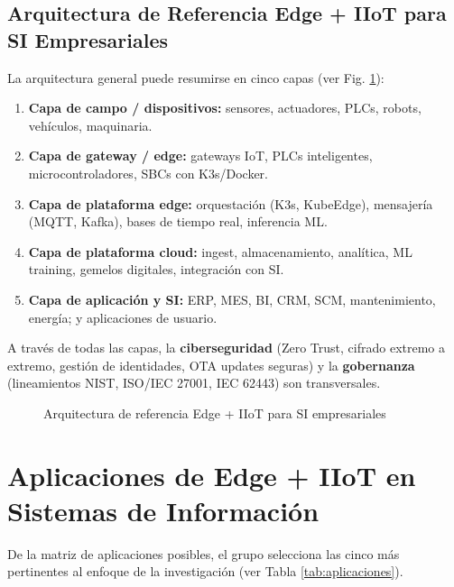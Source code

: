 ﻿\documentclass[12pt,a4paper,oneside]{article}
\begin{document}
\subsection{Arquitectura de Referencia Edge + IIoT para SI Empresariales}

La arquitectura general puede resumirse en cinco capas (ver Fig. \ref{fig:arquitectura}):

\begin{enumerate}[leftmargin=*]
    \item \textbf{Capa de campo / dispositivos:} sensores, actuadores, PLCs, robots, vehículos, maquinaria.
    \item \textbf{Capa de gateway / edge:} gateways IoT, PLCs inteligentes, microcontroladores, SBCs con K3s/Docker.
    \item \textbf{Capa de plataforma edge:} orquestación (K3s, KubeEdge), mensajería (MQTT, Kafka), bases de tiempo real, inferencia ML.
    \item \textbf{Capa de plataforma cloud:} ingest, almacenamiento, analítica, ML training, gemelos digitales, integración con SI.
    \item \textbf{Capa de aplicación y SI:} ERP, MES, BI, CRM, SCM, mantenimiento, energía; y aplicaciones de usuario.
\end{enumerate}

A través de todas las capas, la \textbf{ciberseguridad} (Zero Trust, cifrado extremo a extremo, gestión de identidades, OTA updates seguras) y la \textbf{gobernanza} (lineamientos NIST, ISO/IEC 27001, IEC 62443) son transversales.

\begin{figure}[h!]
\centering
{}
\caption{Arquitectura de referencia Edge + IIoT para SI empresariales}
\label{fig:arquitectura}
\end{figure}

\section{Aplicaciones de Edge + IIoT en Sistemas de Información}

De la matriz de aplicaciones posibles, el grupo selecciona las cinco más pertinentes al enfoque de la investigación (ver Tabla \ref{tab:aplicaciones}).
\end{document}
